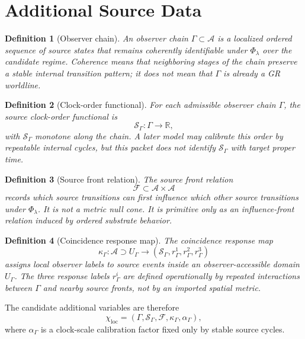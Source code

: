 \documentclass[11pt]{article}
\newcommand{\Sub}{\mathcal{A}}
\newcommand{\PhiFlow}{\Phi_{\lambda}}
\newcommand{\Front}{\mathcal{F}}
\newcommand{\Order}{\mathcal{S}}
\newtheorem{definition}{Definition}
\begin{document}
\section{Additional Source Data}

\begin{definition}[Observer chain]
An observer chain \(\Gamma\subset\Sub\) is a localized ordered sequence of
source states that remains coherently identifiable under \(\PhiFlow\) over the
candidate regime. Coherence means that neighboring stages of the chain preserve
a stable internal transition pattern; it does not mean that \(\Gamma\) is
already a GR worldline.
\end{definition}

\begin{definition}[Clock-order functional]
For each admissible observer chain \(\Gamma\), the source clock-order functional
is
\[
\Order_{\Gamma}:\Gamma\rightarrow\mathbb{R},
\]
with \(\Order_{\Gamma}\) monotone along the chain. A later model may calibrate
this order by repeatable internal cycles, but this packet does not identify
\(\Order_{\Gamma}\) with target proper time.
\end{definition}

\begin{definition}[Source front relation]
The source front relation
\[
\Front\subset\Sub\times\Sub
\]
records which source transitions can first influence which other source
transitions under \(\PhiFlow\). It is not a metric null cone. It is primitive
only as an influence-front relation induced by ordered substrate behavior.
\end{definition}

\begin{definition}[Coincidence response map]
The coincidence response map
\[
\kappa_{\Gamma}:\Sub\supset U_{\Gamma}\rightarrow
(\Order_{\Gamma},r^1_{\Gamma},r^2_{\Gamma},r^3_{\Gamma})
\]
assigns local observer labels to source events inside an observer-accessible
domain \(U_{\Gamma}\). The three response labels \(r^i_{\Gamma}\) are defined
operationally by repeated interactions between \(\Gamma\) and nearby source
fronts, not by an imported spatial metric.
\end{definition}

The candidate additional variables are therefore
\[
\chi_{\mathrm{loc}}
=
(\Gamma,\Order_{\Gamma},\Front,\kappa_{\Gamma},\alpha_{\Gamma}),
\]
where \(\alpha_{\Gamma}\) is a clock-scale calibration factor fixed only by
stable source cycles.
\end{document}
